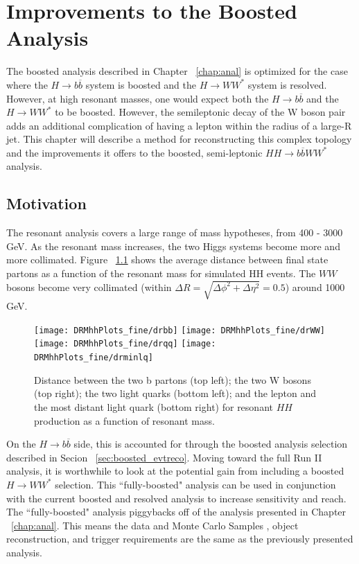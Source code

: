 \chapter{Improvements to the Boosted Analysis}
\label{chap:fully}
The boosted analysis described in Chapter ~\ref{chap:anal} is optimized for the case where the ${H\rightarrow b\overline{b}}$ system is boosted and the ${H\rightarrow WW^{*}}$ system is resolved. However, at high resonant masses, one would expect both the ${H\rightarrow b\overline{b}}$ and the ${H\rightarrow WW^{*}}$ to be boosted. However, the semileptonic decay of the W boson pair adds an additional complication of having a lepton within the radius of a large-R jet. This chapter will describe a method for reconstructing this complex topology and the improvements it offers to the boosted, semi-leptonic ${HH\rightarrow b\overline{b}WW^{*}}$ analysis.
\section{Motivation}
The resonant analysis covers a large range of mass hypotheses, from 400 - 3000 GeV. As the resonant mass increases, the two Higgs systems become more and more collimated. Figure ~\ref{fig:dr} shows the average distance between final state partons as a function of the resonant mass for simulated HH events. The $WW$ bosons become very collimated (within ${\Delta{R} = \sqrt{\Delta{\phi}^{2}+\Delta{\eta}^{2}} = 0.5}$) around 1000 GeV. \newline
\begin{figure}[h]
\begin{center}
\texttt{[image: DRMhhPlots\_fine/drbb]}
\texttt{[image: DRMhhPlots\_fine/drWW]}
\\
\texttt{[image: DRMhhPlots\_fine/drqq]}
\texttt{[image: DRMhhPlots\_fine/drminlq]}

\caption[Distance between parton objects]{Distance between the two b partons (top left); the two W bosons (top right); the two light quarks (bottom left); and the lepton and the most distant light quark (bottom right) for resonant $HH$ production as a function of resonant mass.}
\label{fig:dr}
\end{center}
\end{figure}
\indent On the ${H\rightarrow b\overline{b}}$ side, this is accounted for through the boosted analysis selection described in Secion ~\ref{sec:boosted_evtreco}. Moving toward the full Run II analysis, it is worthwhile to look at the potential gain from including a boosted ${H\rightarrow WW^{*}}$ selection. This ``fully-boosted" analysis can be used in conjunction with the current boosted and resolved analysis to increase sensitivity and reach.\newline
\indent The ``fully-boosted" analysis piggybacks off of the analysis presented in Chapter ~\ref{chap:anal}. This means the data and Monte Carlo Samples , object reconstruction, and trigger requirements are the same as the previously presented analysis. \newline
